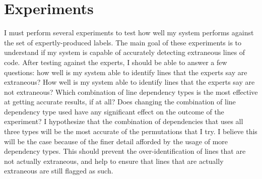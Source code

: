 \documentclass[draft]{article}
\begin{document}

\section{Experiments}

I must perform several experiments to test how well my system performs against the set of expertly-produced labels. The main goal of these experiments is to understand if my system is capable of accurately detecting extraneous lines of code. After testing against the experts, I should be able to answer a few questions: how well is my system able to identify lines that the experts say are extraneous? How well is my system able to identify lines that the experts say are not extraneous? Which combination of line dependency types is the most effective at getting accurate results, if at all? Does changing the combination of line dependency type used have any significant effect on the outcome of the experiment? I hypothesize that the combination of dependencies that uses all three types will be the most accurate of the permutations that I try. I believe this will be the case because of the finer detail afforded by the usage of more dependency types. This should prevent the over-identification of lines that are not actually extraneous, and help to ensure that lines that are actually extraneous are still flagged as such.
\end{document}

